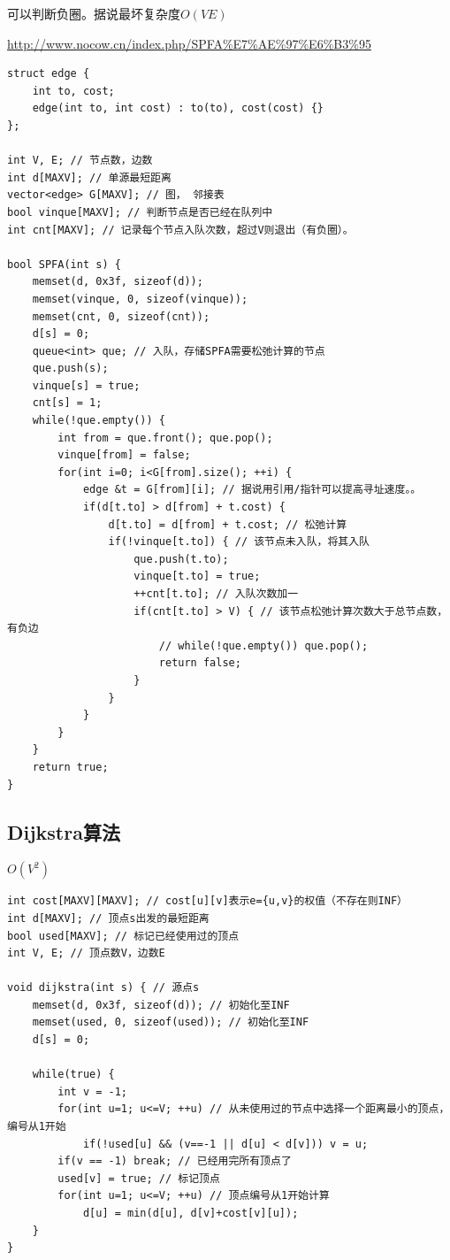 \documentclass[a4paper]{ctexrep}
\begin{document}
可以判断负圈。据说最坏复杂度$O(VE)$

\url{http://www.nocow.cn/index.php/SPFA%E7%AE%97%E6%B3%95}

\begin{lstlisting}
struct edge {
	int to, cost;
	edge(int to, int cost) : to(to), cost(cost) {}
};

int V, E; // 节点数，边数
int d[MAXV]; // 单源最短距离
vector<edge> G[MAXV]; // 图， 邻接表
bool vinque[MAXV]; // 判断节点是否已经在队列中
int cnt[MAXV]; // 记录每个节点入队次数，超过V则退出（有负圈）。

bool SPFA(int s) {
	memset(d, 0x3f, sizeof(d));
	memset(vinque, 0, sizeof(vinque));
	memset(cnt, 0, sizeof(cnt));
	d[s] = 0;
	queue<int> que; // 入队，存储SPFA需要松弛计算的节点
	que.push(s);
	vinque[s] = true;
	cnt[s] = 1;
	while(!que.empty()) {
		int from = que.front(); que.pop();
		vinque[from] = false;
		for(int i=0; i<G[from].size(); ++i) {
			edge &t = G[from][i]; // 据说用引用/指针可以提高寻址速度。。
			if(d[t.to] > d[from] + t.cost) {
				d[t.to] = d[from] + t.cost; // 松弛计算
				if(!vinque[t.to]) { // 该节点未入队，将其入队
					que.push(t.to);
					vinque[t.to] = true;
					++cnt[t.to]; // 入队次数加一
					if(cnt[t.to] > V) { // 该节点松弛计算次数大于总节点数，有负边
						// while(!que.empty()) que.pop();
						return false;
					}
				}
			}
		}
	}
	return true;
}
\end{lstlisting}

\subsection{Dijkstra算法}
$O(V^2)$
\begin{lstlisting}
int cost[MAXV][MAXV]; // cost[u][v]表示e={u,v}的权值（不存在则INF）
int d[MAXV]; // 顶点s出发的最短距离
bool used[MAXV]; // 标记已经使用过的顶点
int V, E; // 顶点数V，边数E

void dijkstra(int s) { // 源点s
	memset(d, 0x3f, sizeof(d)); // 初始化至INF
	memset(used, 0, sizeof(used)); // 初始化至INF
	d[s] = 0;

	while(true) {
		int v = -1;
		for(int u=1; u<=V; ++u) // 从未使用过的节点中选择一个距离最小的顶点，编号从1开始
			if(!used[u] && (v==-1 || d[u] < d[v])) v = u;
		if(v == -1) break; // 已经用完所有顶点了
		used[v] = true; // 标记顶点
		for(int u=1; u<=V; ++u) // 顶点编号从1开始计算
			d[u] = min(d[u], d[v]+cost[v][u]);
	}
}
\end{lstlisting}
\end{document}
